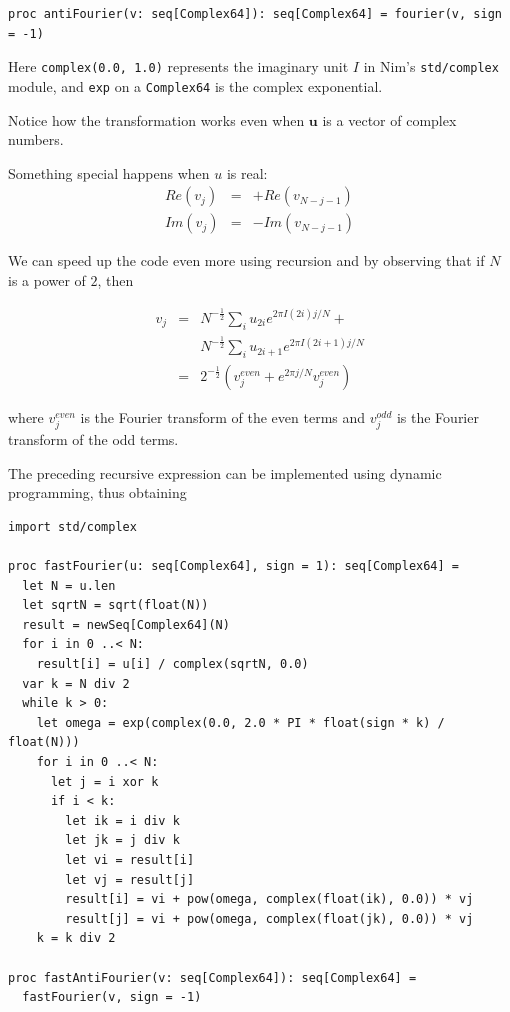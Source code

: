 \documentclass[justified, sixbynine]{tufte-book}
\def\ft{\small\tt}
\theoremstyle{plain}%
\newtheorem * {corollary}{Corollary}
\theoremstyle{definition}
\theoremstyle{remark}
\newtheorem * {remark}{Remark}
\newtheorem * {note}{Note}
\begin{document}
\begin{fullwidth}
\begin{lstlisting}
proc antiFourier(v: seq[Complex64]): seq[Complex64] = fourier(v, sign = -1)
\end{lstlisting}

Here {\ft complex(0.0, 1.0)} represents the imaginary unit $I$ in Nim's {\ft std/complex} module, and {\ft exp} on a {\ft Complex64} is the complex exponential.

Notice how the transformation works even when $\mathbf{u}$ is a vector of complex numbers.

Something special happens when $u$ is real:
\begin{eqnarray}
Re(v_j) &=& +Re(v_{N-j-1}) \\
Im(v_j) &=& -Im(v_{N-j-1})
\end{eqnarray}

We can speed up the code even more using recursion and by observing that if $N$ is a power of $2$, then

\begin{eqnarray}
v_j &=& N^{-\frac12} \sum_i u_{2i} e^{2\pi I (2i)j/N} + \\
             &&  N^{-\frac12} \sum_i u_{2i+1} e^{2\pi I (2i+1)j/N} \\
             &=& 2^{-\frac12} ( v_j^{even} + e^{2\pi j/N} v_j^{even} )
\end{eqnarray}

where $v_j^{even}$ is the Fourier transform of the even terms and $v_j^{odd}$ is the Fourier transform of the odd terms.

The preceding recursive expression can be implemented using dynamic programming, thus obtaining

\begin{lstlisting}
import std/complex

proc fastFourier(u: seq[Complex64], sign = 1): seq[Complex64] =
  let N = u.len
  let sqrtN = sqrt(float(N))
  result = newSeq[Complex64](N)
  for i in 0 ..< N:
    result[i] = u[i] / complex(sqrtN, 0.0)
  var k = N div 2
  while k > 0:
    let omega = exp(complex(0.0, 2.0 * PI * float(sign * k) / float(N)))
    for i in 0 ..< N:
      let j = i xor k
      if i < k:
        let ik = i div k
        let jk = j div k
        let vi = result[i]
        let vj = result[j]
        result[i] = vi + pow(omega, complex(float(ik), 0.0)) * vj
        result[j] = vi + pow(omega, complex(float(jk), 0.0)) * vj
    k = k div 2

proc fastAntiFourier(v: seq[Complex64]): seq[Complex64] =
  fastFourier(v, sign = -1)
\end{lstlisting}


\end{fullwidth}
\end{document}
